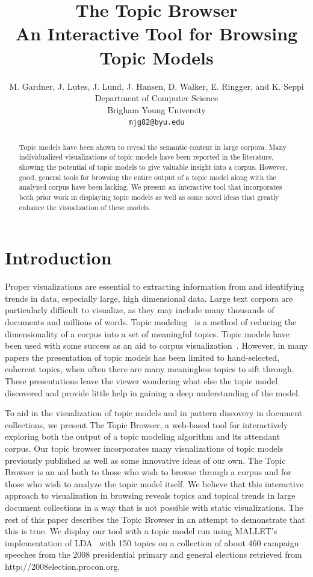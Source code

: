 \documentclass{article}
\title{The Topic Browser\\An Interactive Tool for Browsing Topic Models}
\author{
M. Gardner, J. Lutes, J. Lund, J. Hansen, D. Walker, E. Ringger, and K. Seppi\\
Department of Computer Science \\
Brigham Young University \\
\texttt{mjg82@byu.edu} \\
}
\begin{document}
\nipsfinalcopy %
\maketitle

\begin{abstract}

Topic models have been shown to reveal the semantic content in large corpora.
Many individualized visualizations of topic models have been reported in the
literature, showing the potential of topic models to give valuable insight into
a corpus.  However, good, general tools for browsing the entire output of a
topic model along with the analyzed corpus have been lacking.  We present an
interactive tool that incorporates both prior work in displaying topic models
as well as some novel ideas that greatly enhance the visualization of these
models.

\end{abstract}

\section{Introduction}

Proper visualizations are essential to extracting information from and
identifying trends in data, especially large, high dimensional data.  Large
text corpora are particularly difficult to visualize, as they may include many
thousands of documents and millions of words.  Topic
modeling~\cite{blei-2003-latent-dirichlet-allocation} is a method of reducing
the dimensionality of a corpus into a set of meaningful topics.  Topic models
have been used with some success as an aid to corpus
visualization~\cite{blei-2009-topic-models,
newman-2010-visualizing-with-topic-maps}.  However, in many papers the
presentation of topic models has been limited to hand-selected, coherent
topics, when often there are many meaningless topics to sift through.  These
presentations leave the viewer wondering what else the topic model discovered
and provide little help in gaining a deep understanding of the model.

To aid in the visualization of topic models and in pattern discovery in
document collections, we present The Topic Browser, a web-based tool for
interactively exploring both the output of a topic modeling algorithm and its
attendant corpus.  Our topic browser incorporates many visualizations of topic
models previously published as well as some innovative ideas of our own.  The
Topic Browser is an aid both to those who wish to browse through a corpus and
for those who wish to analyze the topic model itself.  We believe that this
interactive approach to visualization in browsing reveals topics and topical
trends in large document collections in a way that is not possible with static
visualizations.  The rest of this paper describes the Topic Browser in an
attempt to demonstrate that this is true.  We display our tool with a topic
model run using MALLET's implementation of LDA~\cite{mallet} with 150 topics on
a collection of about 460 campaign speeches from the 2008 presidential primary
and general elections retrieved from http://2008election.procon.org.
\end{document}
